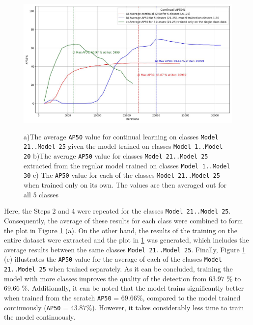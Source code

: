 \begin{figure}[htb]
	\begin{center}
		\includegraphics[width=14cm]{./continualAP_average.jpg}
	\end{center}
	\caption{a)The average \texttt{AP50} value for continual learning on classes \texttt{Model 21..Model 25} given the model trained on classes \texttt{Model 1..Model 20}  b)The average \texttt{AP50} value for classes \texttt{Model 21..Model 25} extracted from the regular model trained on classes \texttt{Model 1..Model 30} c) The \texttt{AP50} value for each of the classes \texttt{Model 21..Model 25} when trained only on its own. The values are then averaged out for all 5 classes }
	\begin{center}	\label{myModel_continuous_experiment_2}
	\end{center}
\end{figure}
\FloatBarrier
  
Here,  the Steps 2 and 4 were repeated for the classes \texttt{Model 21..Model 25}. Consequently, the average of these results for each class were combined to form the plot in Figure \ref{myModel_continuous_experiment_2} (a). On the other hand, the results of the training on the entire dataset were extracted and the plot in  \ref{myModel_continuous_experiment_2} was generated, which includes the average results between the same classes \texttt{Model 21..Model 25}. Finally, Figure \ref{myModel_continuous_experiment_2} (c) illustrates the \texttt{AP50} value for the average of each of the classes \texttt{Model 21..Model 25} when trained separately. As it can be concluded, training the model with more classes improves the quality of the detection from 63.97 \% to 69.66 \%. Additionally, it can be noted that the model trains significantly better when trained from the scratch \texttt{AP50} = 69.66\%, compared to the model trained continuously (\texttt{AP50} = 43.87\%). However, it takes considerably less time to train the model continuously.


